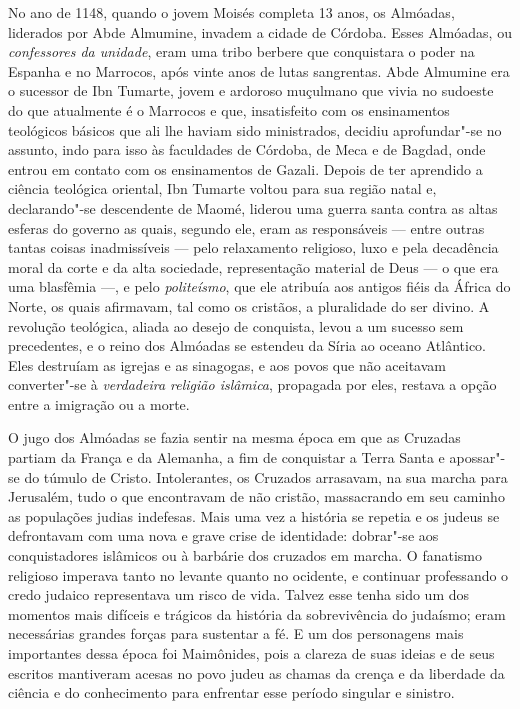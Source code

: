 No ano de 1148, quando o jovem Moisés completa 13 anos, os Almóadas,
liderados por Abde Almumine, invadem a cidade de Córdoba. Esses
Almóadas, ou \emph{confessores da unidade}, eram uma tribo berbere que
conquistara o poder na Espanha e no Marrocos, após vinte anos de lutas
sangrentas. Abde Almumine era o sucessor de Ibn Tumarte, jovem e ardoroso
muçulmano que vivia no sudoeste do que atualmente é o Marrocos e que,
insatisfeito com os ensinamentos teológicos básicos que ali lhe haviam
sido ministrados, decidiu aprofundar"-se no assunto, indo para isso às
faculdades de Córdoba, de Meca e de Bagdad, onde entrou em contato com
os ensinamentos de Gazali. Depois de ter aprendido a ciência teológica
oriental, Ibn Tumarte voltou para sua região natal e, declarando"-se
descendente de Maomé, liderou uma guerra santa contra as altas esferas
do governo as quais, segundo ele, eram as responsáveis --- entre outras
tantas coisas inadmissíveis --- pelo relaxamento religioso, luxo e
pela decadência moral da corte e da alta sociedade, representação
material de Deus --- o que era uma blasfêmia ---, e pelo \emph{politeísmo},
que ele atribuía aos antigos fiéis da África do Norte, os quais
afirmavam, tal como os cristãos, a pluralidade do ser divino. A
revolução teológica, aliada ao desejo de conquista, levou a um sucesso
sem precedentes, e o reino dos Almóadas se estendeu da Síria ao oceano
Atlântico. Eles destruíam as igrejas e as sinagogas, e aos povos que
não aceitavam converter"-se à \emph{verdadeira religião islâmica},
propagada por eles, restava a opção entre a imigração ou a morte.

O jugo dos Almóadas se fazia sentir na mesma época em que as Cruzadas
partiam da França e da Alemanha, a fim de conquistar a Terra Santa e
apossar"-se do túmulo de Cristo. Intolerantes, os Cruzados arrasavam, na
sua marcha para Jerusalém, tudo o que encontravam de não cristão,
massacrando em seu caminho as populações judias indefesas. Mais uma vez
a história se repetia e os judeus se defrontavam com uma nova e grave
crise de identidade: dobrar"-se aos conquistadores islâmicos ou à
barbárie dos cruzados em marcha. O fanatismo religioso imperava tanto
no levante quanto no ocidente, e continuar professando o credo judaico
representava um risco de vida. Talvez esse tenha sido um dos momentos
mais difíceis e trágicos da história da sobrevivência do judaísmo; eram
necessárias grandes forças para sustentar a fé. E um dos personagens
mais importantes dessa época foi Maimônides, pois a clareza de suas
ideias e de seus escritos mantiveram acesas no povo judeu as chamas da
crença e da liberdade da ciência e do conhecimento para enfrentar esse
período singular e sinistro.

